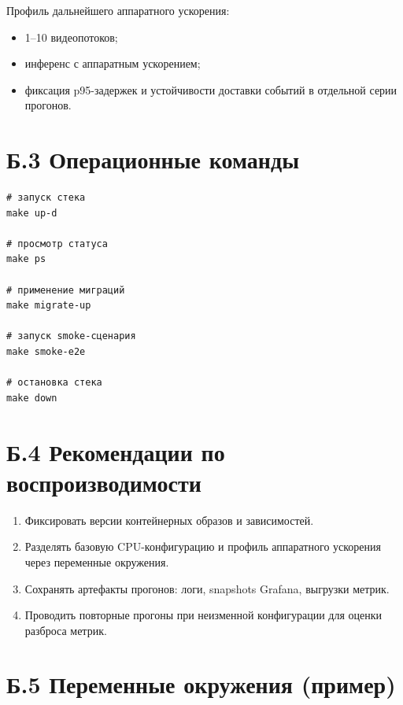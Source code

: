 Профиль дальнейшего аппаратного ускорения:
\begin{itemize}
    \item 1--10 видеопотоков;
    \item инференс с аппаратным ускорением;
    \item фиксация p95-задержек и устойчивости доставки событий в отдельной серии прогонов.
\end{itemize}

\section*{Б.3 Операционные команды}
{}

\begin{verbatim}
# запуск стека
make up-d

# просмотр статуса
make ps

# применение миграций
make migrate-up

# запуск smoke-сценария
make smoke-e2e

# остановка стека
make down
\end{verbatim}

\section*{Б.4 Рекомендации по воспроизводимости}
{}

\begin{enumerate}
    \item Фиксировать версии контейнерных образов и зависимостей.
    \item Разделять базовую CPU-конфигурацию и профиль аппаратного ускорения через переменные окружения.
    \item Сохранять артефакты прогонов: логи, snapshots Grafana, выгрузки метрик.
    \item Проводить повторные прогоны при неизменной конфигурации для оценки разброса метрик.
\end{enumerate}

\section*{Б.5 Переменные окружения (пример)}
{}

